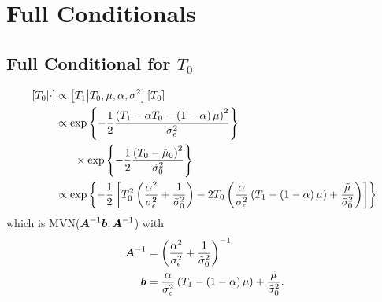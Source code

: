 \documentclass{article}\usepackage[]{graphicx}\usepackage[]{color}
\def\bm#1{\mbox{\boldmath $#1$}}
\begin{document}
\section{Full Conditionals}
%
%
\subsection{Full Conditional for $T_0$}
%
\begin{align*}
%
\left[ T_0 \middle| \cdot \right] & \propto \left[ T_1 \middle| T_0, \mu, \alpha, \sigma^2 \right] \left[ T_0 \right] \\
%
& \propto \exp{ \left\{ - \frac{1} {2} \frac{\left( T_1 - \alpha T_0 - \left( 1 - \alpha \right) \mu \right)^2} {\sigma^2_\epsilon} \right\} }\\
%
& \hspace{6mm} \times \exp{ \left\{ - \frac{1} {2} \frac{\left( T_0 - \tilde{\mu}_0 \right)^2} {\tilde{\sigma}^2_0} \right\} }\\
%
& \propto \exp{ \left\{ - \frac{1} {2} \left[ T_0^2 \left( \frac{\alpha^2} {\sigma^2_\epsilon} + \frac{1} {\tilde{\sigma}^2_0} \right) - 2 T_0 \left(  \frac{\alpha} {\sigma^2_\epsilon} \left( T_1 - \left( 1 - \alpha \right) \mu \right) + \frac{\tilde{\mu}} {\tilde{\sigma}^2_0} \right) \right]\right\} }
%
\end{align*}
% 
which is MVN($\bm{A}^{ - 1}\bm{b}, \bm{A}^{ - 1}$) with \\
%
\begin{align*}
%
\bm{A}^{ - 1} & = \left( \frac{\alpha^2} {\sigma^2_\epsilon} + \frac{1} {\tilde{\sigma}^2_0} \right)^{ - 1}\\
%
\bm{b} & = \frac{\alpha} {\sigma^2_\epsilon} \left( T_1 - \left( 1 - \alpha \right) \mu \right) + \frac{\tilde{\mu}} {\tilde{\sigma}^2_0}.
%
\end{align*}
%
\end{document}
